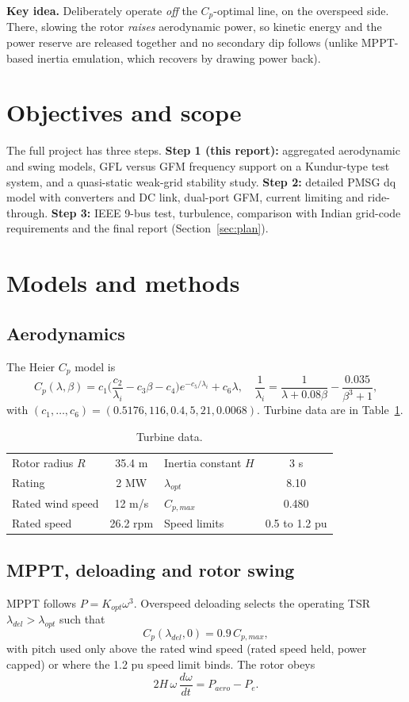\documentclass[11pt,a4paper]{article}
\begin{document}
\textbf{Key idea.} Deliberately operate \emph{off} the $C_p$-optimal line, on the overspeed side. There, slowing the rotor \emph{raises} aerodynamic power, so kinetic energy and the power reserve are released together and no secondary dip follows (unlike MPPT-based inertia emulation, which recovers by drawing power back).

\section{Objectives and scope}
The full project has three steps. \textbf{Step 1 (this report):} aggregated aerodynamic and swing models, GFL versus GFM frequency support on a Kundur-type test system, and a quasi-static weak-grid stability study. \textbf{Step 2:} detailed PMSG dq model with converters and DC link, dual-port GFM, current limiting and ride-through. \textbf{Step 3:} IEEE 9-bus test, turbulence, comparison with Indian grid-code requirements and the final report (Section~\ref{sec:plan}).

\section{Models and methods}
\subsection{Aerodynamics}
The Heier $C_p$ model \cite{heier} is
\begin{equation}
C_p(\lambda,\beta)=c_1\Big(\frac{c_2}{\lambda_i}-c_3\beta-c_4\Big)e^{-c_5/\lambda_i}+c_6\lambda,\quad
\frac1{\lambda_i}=\frac1{\lambda+0.08\beta}-\frac{0.035}{\beta^3+1},
\end{equation}
with $(c_1,\dots,c_6)=(0.5176,116,0.4,5,21,0.0068)$. Turbine data are in Table~\ref{tab:turb}.
\begin{table}[H]\centering\caption{Turbine data.}\label{tab:turb}
\begin{tabular}{lc|lc}\toprule
Rotor radius $R$ & 35.4 m & Inertia constant $H$ & 3 s\\
Rating & 2 MW & $\lambda_{opt}$ & 8.10\\
Rated wind speed & 12 m/s & $C_{p,max}$ & 0.480\\
Rated speed & 26.2 rpm & Speed limits & 0.5 to 1.2 pu\\\bottomrule
\end{tabular}\end{table}
\subsection{MPPT, deloading and rotor swing}
MPPT follows $P=K_{opt}\omega^3$. Overspeed deloading selects the operating TSR $\lambda_{del}>\lambda_{opt}$ such that
\begin{equation}C_p(\lambda_{del},0)=0.9\,C_{p,max},\end{equation}
with pitch used only above the rated wind speed (rated speed held, power capped) or where the 1.2 pu speed limit binds. The rotor obeys
\begin{equation}2H\,\omega\,\frac{d\omega}{dt}=P_{aero}-P_e.\end{equation}
\end{document}
